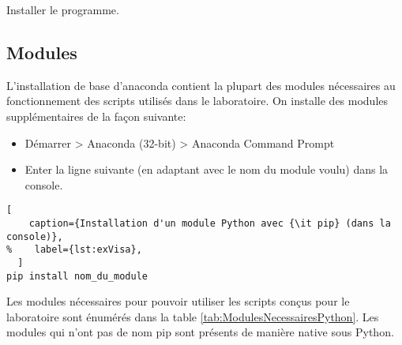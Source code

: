 \documentclass[11pt,francais]{book} %
\begin{document}
	Installer le programme. 	

\subsection{Modules}

L'installation de base d'anaconda contient la plupart des modules nécessaires au fonctionnement des scripts utilisés dans le laboratoire.
On installe des modules supplémentaires de la fa\c{c}on suivante:
\begin{itemize}
\item Démarrer > Anaconda (32-bit) > Anaconda Command Prompt
 \item Enter la ligne suivante (en adaptant avec le nom du module voulu) dans la console.
\end{itemize}

\begin{lstlisting}[
    caption={Installation d'un module Python avec {\it pip} (dans la console)},
%    label={lst:exVisa},
  ]
pip install nom_du_module
\end{lstlisting}

Les modules nécessaires pour pouvoir utiliser les scripts con\c{c}us pour le laboratoire sont énumérés dans la table \ref{tab:ModulesNecessairesPython}.
Les modules qui n'ont pas de nom pip sont présents de manière native sous Python.

\begin{table}[htb]
  \caption{Modules nécessaires au fonctionnement des scripts du laboratoire}
  \label{tab:ModulesNecessairesPython}
  \centering
\end{table}
\end{document}
